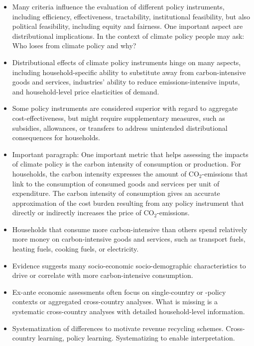 \documentclass[12pt, a4paper]{article}
\begin{document}
\begin{itemize}
    
  \item Many criteria influence the evaluation of different policy instruments, including efficiency, effectiveness, tractability, institutional feasibility, but also political feasibility, including equity and fairness. One important aspect are distributional implications. In the context of climate policy people may ask: Who loses from climate policy and why?
  \item Distributional effects of climate policy instruments hinge on many aspects, including household-specific ability to substitute away from carbon-intensive goods and services, industries' ability to reduce emissions-intensive inputs, and household-level price elasticities of demand.
  \item Some policy instruments are considered superior with regard to aggregate cost-effectiveness, but might require supplementary measures, such as subsidies, allowances, or transfers to address unintended distributional consequences for households.
  \item Important paragraph: One important metric that helps assessing the impacts of climate policy is the carbon intensity of consumption or production. For households, the carbon intensity expresses the amount of CO$_{2}$-emissions that link to the consumption of consumed goods and services per unit of expenditure. The carbon intensity of consumption gives an accurate approximation of the cost burden resulting from any policy instrument that directly or indirectly increases the price of CO$_{2}$-emissions.
  \item Households that consume more carbon-intensive than others spend relatively more money on carbon-intensive goods and services, such as transport fuels, heating fuels, cooking fuels, or electricity.
  \item Evidence suggests many socio-economic socio-demographic characteristics to drive or correlate with more carbon-intensive consumption.
  \item Ex-ante economic assessments often focus on single-country or -policy contexts or aggregated cross-country analyses. What is missing is a systematic cross-country analyses with detailed household-level information.
  \item Systematization of differences to motivate revenue recycling schemes. Cross-country learning, policy learning. Systematizing to enable interpretation.
\end{itemize}
\end{document}
